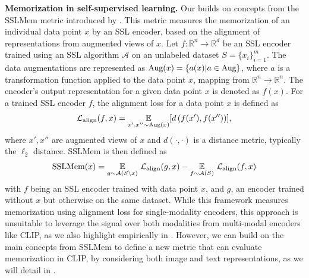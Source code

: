 \textbf{Memorization in self-supervised learning.}
Our \ours builds on concepts from the SSLMem metric introduced by \citet{wang2024memorization}. This metric measures the memorization of an individual data point $x$  by an SSL encoder, based on the alignment of representations from augmented views of $x$. Let $f:\mathbb{R}^n \to \mathbb{R}^d$ be an SSL encoder trained using an SSL algorithm $\mathcal{A}$ on an unlabeled dataset $S = \{x_i\}_{i=1}^{m}$. The data augmentations are represented as $\text{Aug}(x) = \{a(x) | a \in \text{Aug}\}$, 
where $a$ is a transformation function applied to the data point $x$, mapping from $\mathbb{R}^n \to \mathbb{R}^n$.
The encoder's output representation for a given data point $x$ is denoted as $f(x)$. For a trained SSL encoder $f$, the alignment loss for a data point $x$ is defined as
\begin{equation}
    \mathcal{L}_{\text{align}}(f, x) = \underset{ {x}', {x}'' \sim \text{Aug}(x) }{\mathbb{E}} [ d\left({f}({x}'), {f}({x}'')\right) ]\text{,}
    \label{eq:alignment_loss}
\end{equation}
where $x', x''$ are augmented views of $x$ and $d(\cdot, \cdot)$ is a distance metric, typically the $\ell_2$ distance.
SSLMem is then defined as
\begin{equation}\label{eq:memdef}
    \begin{split}
    \text{SSLMem}(x) =  \underset{g \sim \mathcal{A}(S \setminus x)}{\mathbb{E}} \ \mathcal{L}_{\text{align}}(g, x)
    - \underset{f \sim \mathcal{A} (S)}{\mathbb{E}} \ \mathcal{L}_{\text{align}}(f, x)  
    \end{split}
    \end{equation}
with $f$ being an SSL encoder trained with data point $x$, and $g$, an encoder trained without $x$ but otherwise on the same dataset.
While this framework measures memorization using alignment loss for single-modality encoders, this approach is unsuitable to leverage the signal over both modalities from multi-modal encoders like CLIP, as we also highlight empirically in . 
However, we can build on the main concepts from SSLMem to define a new metric that can evaluate memorization in CLIP, by considering both image and text representations, as we will detail in .
